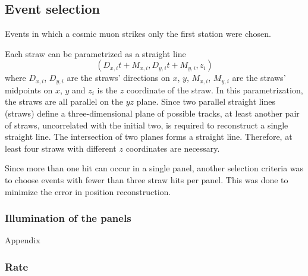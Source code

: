 \subsection{Event selection}
Events in which a cosmic muon strikes only the first station were chosen. 

Each straw can be parametrized as a straight line
\begin{equation}\label{equaretta}
    (D_{x,i}t+M_{x,i},D_{y,i}t+M_{y,i},z_i)
\end{equation}
where $D_{x,i}$, $D_{y,i}$ are the straws' directions on $x$, $y$, $M_{x,i}$, $M_{y,i}$ are the straws' midpoints on $x$, $y$ and $z_i$ is the $z$ coordinate of the straw.
In this parametrization, the straws are all parallel on the $yz$ plane.
Since two parallel straight lines (straws) define a three-dimensional plane of possible tracks, 
at least another pair of straws, uncorrelated with the initial two, is required to reconstruct a 
single straight line. The intersection of two planes forms a straight line. Therefore, at least four straws with different $z$ coordinates are necessary.

Since more than one hit can occur in a single panel, another selection criteria 
was to choose events with fewer than three straw hits per panel. This was done to minimize the error in position reconstruction.
\subsubsection{Illumination of the panels}
Appendix
\subsubsection{Rate}
